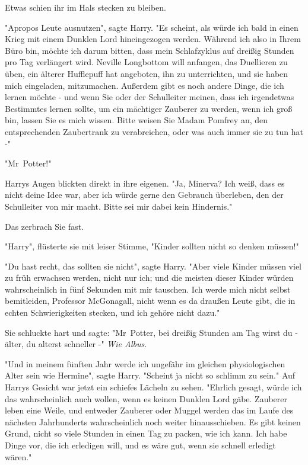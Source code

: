 {Etwas schien ihr im Hals stecken zu bleiben.

"Apropos Leute ausnutzen", sagte Harry. "Es scheint, als würde ich bald in einen Krieg mit einem Dunklen Lord hineingezogen werden. Während ich also in Ihrem Büro bin, möchte ich darum bitten, dass mein Schlafzyklus auf dreißig Stunden pro Tag verlängert wird. Neville Longbottom will anfangen, das Duellieren zu üben, ein älterer Hufflepuff hat angeboten, ihn zu unterrichten, und sie haben mich eingeladen, mitzumachen. Außerdem gibt es noch andere Dinge, die ich lernen möchte - und wenn Sie oder der Schulleiter meinen, dass ich irgendetwas Bestimmtes lernen sollte, um ein mächtiger Zauberer zu werden, wenn ich groß bin, lassen Sie es mich wissen. Bitte weisen Sie Madam Pomfrey an, den entsprechenden Zaubertrank zu verabreichen, oder was auch immer sie zu tun hat -"

"Mr~Potter!"

Harrys Augen blickten direkt in ihre eigenen. "Ja, Minerva? Ich weiß, dass es nicht deine Idee war, aber ich würde gerne den Gebrauch überleben, den der Schulleiter von mir macht. Bitte sei mir dabei kein Hindernis."

Das zerbrach Sie fast.

"Harry", flüsterte sie mit leiser Stimme, "Kinder sollten nicht so denken müssen!"

"Du hast recht, das sollten sie nicht", sagte Harry. "Aber viele Kinder müssen viel zu früh erwachsen werden, nicht nur ich; und die meisten dieser Kinder würden wahrscheinlich in fünf Sekunden mit mir tauschen. Ich werde mich nicht selbst bemitleiden, Professor McGonagall, nicht wenn es da draußen Leute gibt, die in echten Schwierigkeiten stecken, und ich gehöre nicht dazu."

Sie schluckte hart und sagte: "Mr~Potter, bei dreißig Stunden am Tag wirst du - älter, du alterst schneller -" \emph{Wie Albus}.

"Und in meinem fünften Jahr werde ich ungefähr im gleichen physiologischen Alter sein wie Hermine", sagte Harry. "Scheint ja nicht so schlimm zu sein." Auf Harrys Gesicht war jetzt ein schiefes Lächeln zu sehen. "Ehrlich gesagt, würde ich das wahrscheinlich auch wollen, wenn es keinen Dunklen Lord gäbe. Zauberer leben eine Weile, und entweder Zauberer oder Muggel werden das im Laufe des nächsten Jahrhunderts wahrscheinlich noch weiter hinausschieben. Es gibt keinen Grund, nicht so viele Stunden in einen Tag zu packen, wie ich kann. Ich habe Dinge vor, die ich erledigen will, und es wäre gut, wenn sie schnell erledigt wären."

}
